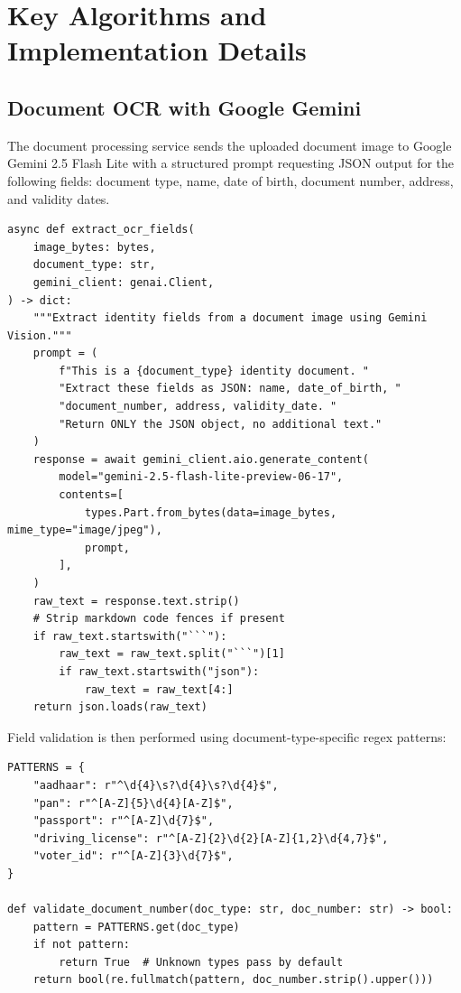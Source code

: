 \section{Key Algorithms and Implementation Details}

\subsection{Document OCR with Google Gemini}

The document processing service sends the uploaded document image to Google Gemini 2.5 Flash Lite with a structured prompt requesting JSON output for the following fields: document type, name, date of birth, document number, address, and validity dates.

\begin{lstlisting}[style=pythonstyle, caption=Document Processing -- Gemini OCR (simplified)]
async def extract_ocr_fields(
    image_bytes: bytes,
    document_type: str,
    gemini_client: genai.Client,
) -> dict:
    """Extract identity fields from a document image using Gemini Vision."""
    prompt = (
        f"This is a {document_type} identity document. "
        "Extract these fields as JSON: name, date_of_birth, "
        "document_number, address, validity_date. "
        "Return ONLY the JSON object, no additional text."
    )
    response = await gemini_client.aio.generate_content(
        model="gemini-2.5-flash-lite-preview-06-17",
        contents=[
            types.Part.from_bytes(data=image_bytes, mime_type="image/jpeg"),
            prompt,
        ],
    )
    raw_text = response.text.strip()
    # Strip markdown code fences if present
    if raw_text.startswith("```"):
        raw_text = raw_text.split("```")[1]
        if raw_text.startswith("json"):
            raw_text = raw_text[4:]
    return json.loads(raw_text)
\end{lstlisting}

Field validation is then performed using document-type-specific regex patterns:

\begin{lstlisting}[style=pythonstyle, caption=Document Number Validation Patterns]
PATTERNS = {
    "aadhaar": r"^\d{4}\s?\d{4}\s?\d{4}$",
    "pan": r"^[A-Z]{5}\d{4}[A-Z]$",
    "passport": r"^[A-Z]\d{7}$",
    "driving_license": r"^[A-Z]{2}\d{2}[A-Z]{1,2}\d{4,7}$",
    "voter_id": r"^[A-Z]{3}\d{7}$",
}

def validate_document_number(doc_type: str, doc_number: str) -> bool:
    pattern = PATTERNS.get(doc_type)
    if not pattern:
        return True  # Unknown types pass by default
    return bool(re.fullmatch(pattern, doc_number.strip().upper()))
\end{lstlisting}

